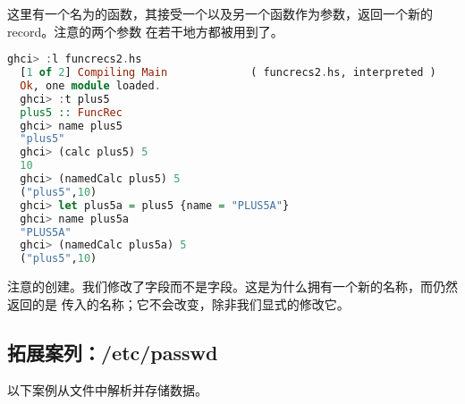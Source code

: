\documentclass[./main.tex]{subfiles}
\begin{document}
这里有一个名为的函数，其接受一个以及另一个函数作为参数，返回一个新的 record。注意的两个参数
在若干地方都被用到了。

\begin{lstlisting}[language=Haskell]
  ghci> :l funcrecs2.hs
  [1 of 2] Compiling Main             ( funcrecs2.hs, interpreted )
  Ok, one module loaded.
  ghci> :t plus5
  plus5 :: FuncRec
  ghci> name plus5
  "plus5"
  ghci> (calc plus5) 5
  10
  ghci> (namedCalc plus5) 5
  ("plus5",10)
  ghci> let plus5a = plus5 {name = "PLUS5A"}
  ghci> name plus5a
  "PLUS5A"
  ghci> (namedCalc plus5a) 5
  ("plus5",10)
\end{lstlisting}

注意的创建。我们修改了字段而不是字段。这是为什么拥有一个新的名称，而仍然返回的是
传入的名称；它不会改变，除非我们显式的修改它。

\subsection*{拓展案列：/etc/passwd}

以下案例从文件中解析并存储数据。
\end{document}
